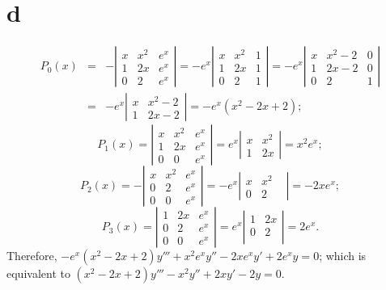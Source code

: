 \documentclass[dvips]{book}
\numberwithin{example}{section}
\numberwithin{equation}{section}
\numberwithin{theorem}{section}
\numberwithin{table}{section}
\numberwithin{figure}{section}
\begin{document}
\part{d}
\begin{eqnarray*}
P_0(x)&=&
-\left|\begin{array}{ccc}
x&x^2&e^x\\
1&2x&e^x\\
0&2&e^x
\end{array}\right|=
-e^x\left|\begin{array}{ccc}
x&x^2&1\\
1&2x&1\\
0&2&1
\end{array}\right|=
-e^x\left|\begin{array}{ccc}
x&x^2-2&0\\
1&2x-2&0\\
0&2&1
\end{array}\right|\\
&=&-e^x\left|\begin{array}{ccc}
x&x^2-2\\
1&2x-2
\end{array}\right|=-e^x(x^2-2x+2);
\end{eqnarray*}
$$
P_1(x)=
\left|\begin{array}{ccc}
x&x^2&e^x\\
1&2x&e^x\\
0&0&e^x
\end{array}\right|=
e^x\left|\begin{array}{ccc}
x&x^2\\
1&2x
\end{array}\right|=x^2e^x;
$$
$$
P_2(x)=
-\left|\begin{array}{ccc}
x&x^2&e^x\\
0&2&e^x\\
0&0&e^x
\end{array}\right|=
-e^x\left|\begin{array}{ccc}
x&x^2\\
0&2&
\end{array}\right|=-2xe^x;
$$
$$
P_3(x)=
\left|\begin{array}{ccc}
1&2x&e^x\\
0&2&e^x\\
0&0&e^x
\end{array}\right|=
e^x\left|\begin{array}{ccc}
1&2x\\
0&2\\
\end{array}\right|=2e^x.
$$
Therefore,
$-e^x(x^2-2x+2)y'''+x^2e^xy''-2xe^xy'+2e^xy=0$;
which is equivalent to
 $(x^2-2x+2)y'''-x^2y''+2xy'-2y=0$.
\end{document}
